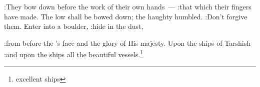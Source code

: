\begin{inparaenum}
  :They bow down before the work of their own hands~--- :that which their fingers have made.%
   The low shall be bowed down; the haughty humbled. :Don't forgive them.%
   Enter into a boulder, :hide in the dust,%
  
  :from before the \lord's face and the glory of His majesty.
   Upon the ships of Tarshish :and upon the ships all the beautiful vessels.\footnote{excellent ships}%
\end{inparaenum}
